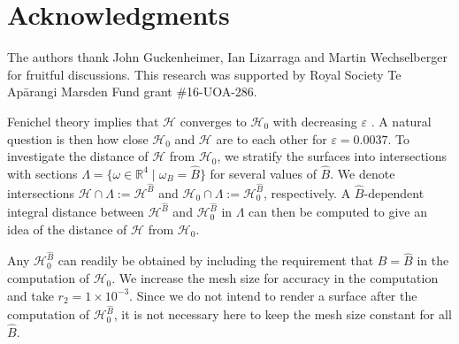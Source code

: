 \documentclass{ws-ijbc}
\begin{document}
\bigskip

\section*{Acknowledgments}
%
The authors thank John Guckenheimer, Ian Lizarraga and Martin Wechselberger for fruitful discussions. This research was supported by Royal Society Te Ap\={a}rangi Marsden Fund grant \#16-UOA-286. 


\newpage


\label{sec:dist}
%
Fenichel theory implies that $\mathscr{H}$ converges to $\mathscr{H}_0$ with decreasing $\varepsilon$ \cite{Fenichel}.  A natural question is then how close $\mathscr{H}_0$ and $\mathscr{H}$ are to each other for $\varepsilon=0.0037$.  To investigate the distance of $\mathscr{H}$ from $\mathscr{H}_0$, we stratify the surfaces into intersections with sections $\Lambda = \{ \omega \in \mathbb{R}^4 \; | \; \omega_B = \widehat{B}\}$ for several values of $\widehat{B}$.  We denote intersections $\mathscr{H} \cap \Lambda := \mathscr{H}^{\widehat{B}}$ and $\mathscr{H}_0 \cap \Lambda := \mathscr{H}_0^{\widehat{B}}$, respectively.  A $\widehat{B}$-dependent integral distance between $\mathscr{H}^{\widehat{B}}$ and $\mathscr{H}_0^{\widehat{B}}$ in $\Lambda$ can then be computed to give an idea of the distance of $\mathscr{H}$ from $\mathscr{H}_0$.

Any $\mathscr{H}_0^{\widehat{B}}$ can readily be obtained by including the requirement that $B=\widehat{B}$ in the computation of $\mathscr{H}_0$.  We increase the mesh size for accuracy in the computation and take $r_2=1\times10^{-3}$.  Since we do not intend to render a surface after the computation of $\mathscr{H}_0^{\widehat{B}}$, it is not necessary here to keep the mesh size constant for all $\widehat{B}$.
\end{document}
